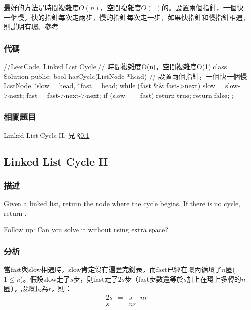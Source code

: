 最好的方法是時間複雜度$O(n)$，空間複雜度$O(1)$的。設置兩個指針，一個快一個慢，快的指針每次走兩步，慢的指針每次走一步，如果快指針和慢指針相遇，則説明有環。參考


\subsubsection{代碼}
\begin{Code}
//LeetCode, Linked List Cycle
// 時間複雜度O(n)，空間複雜度O(1)
class Solution {
public:
    bool hasCycle(ListNode *head) {
        // 設置兩個指針，一個快一個慢
        ListNode *slow = head, *fast = head;
        while (fast && fast->next) {
            slow = slow->next;
            fast = fast->next->next;
            if (slow == fast) return true;
        }
        return false;
    }
};
\end{Code}


\subsubsection{相關題目}
\begindot
\item Linked List Cycle II, 見 \S \ref{sec:linked-list-cycle-ii}
\myenddot


\subsection{Linked List Cycle II}
\label{sec:linked-list-cycle-ii}


\subsubsection{描述}
Given a linked list, return the node where the cycle begins. If there is no cycle, return .

Follow up:
Can you solve it without using extra space?


\subsubsection{分析}
當fast與slow相遇時，slow肯定沒有遍歷完鏈表，而fast已經在環內循環了$n$圈($1 \leq n$)。假設slow走了$s$步，則fast走了$2s$步（fast步數還等於$s$加上在環上多轉的$n$圈），設環長為$r$，則：
\begin{eqnarray}
2s &=& s + nr \nonumber \\
s &=& nr \nonumber
\end{eqnarray}


